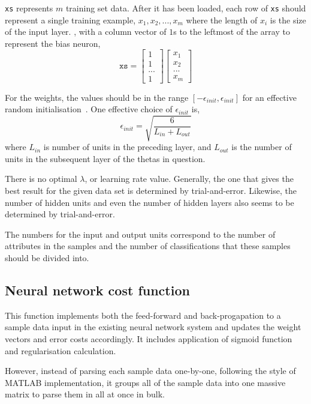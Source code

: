 \texttt{xs} represents $m$ training set data. After it has been loaded, each row of \texttt{xs} should represent a single training example, $x_1, x_2, ..., x_m$ where the length of $x_i$ is the size of the input layer. , with a column vector of $1$s to the leftmost of the array to represent the bias neuron,
\[
 \texttt{xs} =
    \begin{bmatrix}
      1 \\
      1 \\
      ... \\ 
      1
    \end{bmatrix}
    \begin{bmatrix}
       x_1 \\
       x_2 \\
       ... \\
       x_m
    \end{bmatrix}
\]

For the weights, the values should be in the range $[-\epsilon_{init}, \epsilon_{init}]$ for an effective random initialisation~\cite{Ng12}. One effective choice of $\epsilon_{init}$ is,
\[ \epsilon_{init} = \sqrt{\frac{6}{L_{in} + L_{out}}} \]
where $L_{in}$ is number of units in the preceding layer, and $L_{out}$ is the number of units in the subsequent layer of the thetas in question. 

There is no optimal $\lambda$, or learning rate value. Generally, the one that gives the best result for the given data set is determined by trial-and-error. Likewise, the number of hidden units and even the number of hidden layers also seems to be determined by trial-and-error.

The numbers for the input and output units correspond to the number of attributes in the samples and the number of classifications that these samples should be divided into.

\subsection{Neural network cost function} \label{se:impl.nnCostFunction}

This function implements both the feed-forward and back-progapation to a sample data input in the existing neural network system and updates the weight vectors and error costs accordingly. It includes application of sigmoid function and regularisation calculation. 

However, instead of parsing each sample data one-by-one, following the style of MATLAB implementation, it groups all of the sample data into one massive matrix to parse them in all at once in bulk. 

